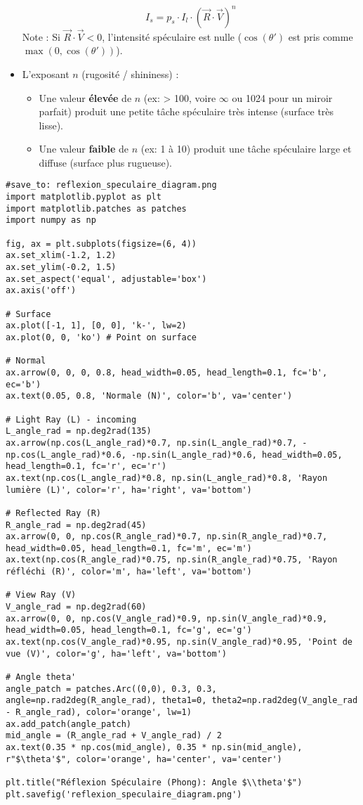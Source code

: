 \documentclass{article}
\begin{document}
\begin{itemize}
      \[ I_s = p_s \cdot I_l \cdot (\vec{R} \cdot \vec{V})^n \]
      Note : Si $\vec{R} \cdot \vec{V} < 0$, l'intensité spéculaire est nulle ($\cos(\theta')$ est pris comme $\max(0, \cos(\theta'))$).
    \item L'exposant $n$ (rugosité / shininess) :
        \begin{itemize}
            \item Une valeur \textbf{élevée} de $n$ (ex: > 100, voire $\infty$ ou 1024 pour un miroir parfait) produit une petite tâche spéculaire très intense (surface très lisse).
            \item Une valeur \textbf{faible} de $n$ (ex: 1 à 10) produit une tâche spéculaire large et diffuse (surface plus rugueuse).
        \end{itemize}
\end{itemize}

\begin{verbatim}
#save_to: reflexion_speculaire_diagram.png
import matplotlib.pyplot as plt
import matplotlib.patches as patches
import numpy as np

fig, ax = plt.subplots(figsize=(6, 4))
ax.set_xlim(-1.2, 1.2)
ax.set_ylim(-0.2, 1.5)
ax.set_aspect('equal', adjustable='box')
ax.axis('off')

# Surface
ax.plot([-1, 1], [0, 0], 'k-', lw=2)
ax.plot(0, 0, 'ko') # Point on surface

# Normal
ax.arrow(0, 0, 0, 0.8, head_width=0.05, head_length=0.1, fc='b', ec='b')
ax.text(0.05, 0.8, 'Normale (N)', color='b', va='center')

# Light Ray (L) - incoming
L_angle_rad = np.deg2rad(135)
ax.arrow(np.cos(L_angle_rad)*0.7, np.sin(L_angle_rad)*0.7, -np.cos(L_angle_rad)*0.6, -np.sin(L_angle_rad)*0.6, head_width=0.05, head_length=0.1, fc='r', ec='r')
ax.text(np.cos(L_angle_rad)*0.8, np.sin(L_angle_rad)*0.8, 'Rayon lumière (L)', color='r', ha='right', va='bottom')

# Reflected Ray (R)
R_angle_rad = np.deg2rad(45)
ax.arrow(0, 0, np.cos(R_angle_rad)*0.7, np.sin(R_angle_rad)*0.7, head_width=0.05, head_length=0.1, fc='m', ec='m')
ax.text(np.cos(R_angle_rad)*0.75, np.sin(R_angle_rad)*0.75, 'Rayon réfléchi (R)', color='m', ha='left', va='bottom')

# View Ray (V)
V_angle_rad = np.deg2rad(60)
ax.arrow(0, 0, np.cos(V_angle_rad)*0.9, np.sin(V_angle_rad)*0.9, head_width=0.05, head_length=0.1, fc='g', ec='g')
ax.text(np.cos(V_angle_rad)*0.95, np.sin(V_angle_rad)*0.95, 'Point de vue (V)', color='g', ha='left', va='bottom')

# Angle theta'
angle_patch = patches.Arc((0,0), 0.3, 0.3, angle=np.rad2deg(R_angle_rad), theta1=0, theta2=np.rad2deg(V_angle_rad - R_angle_rad), color='orange', lw=1)
ax.add_patch(angle_patch)
mid_angle = (R_angle_rad + V_angle_rad) / 2
ax.text(0.35 * np.cos(mid_angle), 0.35 * np.sin(mid_angle), r"$\theta'$", color='orange', ha='center', va='center')

plt.title("Réflexion Spéculaire (Phong): Angle $\\theta'$")
plt.savefig('reflexion_speculaire_diagram.png')
\end{verbatim}
\end{document}
